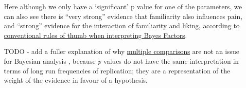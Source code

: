 \documentclass[]{article}
\newenvironment{Shaded}{\begin{snugshade}}{\end{snugshade}}
\newcommand{\ControlFlowTok}[1]{\textcolor[rgb]{0.13,0.29,0.53}{\textbf{#1}}}
\newcommand{\DecValTok}[1]{\textcolor[rgb]{0.00,0.00,0.81}{#1}}
\newcommand{\FloatTok}[1]{\textcolor[rgb]{0.00,0.00,0.81}{#1}}
\newcommand{\KeywordTok}[1]{\textcolor[rgb]{0.13,0.29,0.53}{\textbf{#1}}}
\newcommand{\NormalTok}[1]{#1}
\newcommand{\OperatorTok}[1]{\textcolor[rgb]{0.81,0.36,0.00}{\textbf{#1}}}
\newcommand{\OtherTok}[1]{\textcolor[rgb]{0.56,0.35,0.01}{#1}}
\newcommand{\StringTok}[1]{\textcolor[rgb]{0.31,0.60,0.02}{#1}}
\begin{document}
\begin{Shaded}
\end{Shaded}

Here although we only have a `significant' p value for one of the parameters, we
can also see there is ``very strong'' evidence that familiarity also influences
pain, and ``strong'' evidence for the interaction of familiarity and liking,
according to
\href{https://en.wikipedia.org/wiki/Bayes_factor\#Interpretation}{conventional rules of thumb when interpreting Bayes Factors}.

TODO - add a fuller explanation of why
\protect\hyperlink{mutiple-comparisons}{multiple comparisons} are not an issue for Bayesian
analysis \citep{gelman2012we}, because \emph{p} values do not have the same interpretation
in terms of long run frequencies of replication; they are a representation of
the weight of the evidence in favour of a hypothesis.
\end{document}
